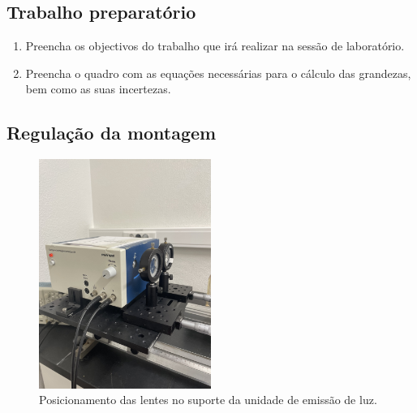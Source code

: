 \documentclass[12pt,a4paper,oneside]{paper}
\begin{document}
\subsection{\sf Trabalho preparatório} 
    \begin{enumerate}
    \item Preencha os objectivos do trabalho que irá realizar na sessão de laboratório. 
    \item Preencha o quadro com as equações necessárias para o cálculo das grandezas, bem como as suas incertezas. 
    \end{enumerate}


\subsection{\sf Regulação da montagem}
 
    \begin{figure}[H]  
        \centering 
        \includegraphics[width=0.5\textwidth]{./luz_images/fig5.jpg}
        \caption{Posicionamento das lentes no suporte da unidade de emissão de luz. \label{fig:lentes}} 
    \end{figure}
\end{document}
